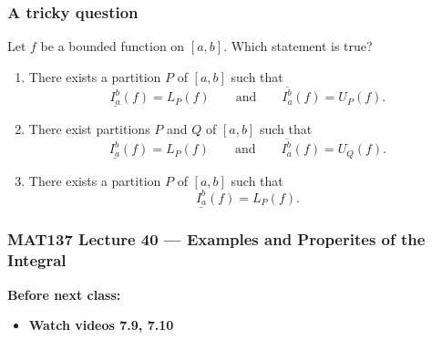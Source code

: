 \documentclass[14pt]{beamer}
\newcommand{\p}{\pause}
\newcommand{\setsize}[1]{\fontsize{#1}{#1}\selectfont} %
\newcommand{\smallerfont}{\setsize{13}} %
\newcommand{\lifab}{\underline{I_a^b}(f)}
\newcommand{\uifab}{\overline{I_a^b}(f)}
\newcommand{\puntos}[2]{ \draw[thick] (-5,0) to (5,0);

\draw[decorate, decoration={brace, amplitude=10pt}, yshift=10pt] (#1-3.5,-0) -- (#1-0,-0)
node [red,midway,yshift=20pt]{lower sums};

\draw[red, fill] (#1-2.5,0) circle [radius=0.1] ; \draw[red, fill] (#1-3.3,0)
circle [radius=0.1] ; \draw[red, fill] (#1-2.0,0) circle [radius=0.1] ; \draw[red,
fill] (#1-1.8,0) circle [radius=0.1] ; \draw[red, fill] (#1-1.3,0) circle [radius=0.1]
; \draw[red, fill] (#1-0.8,0) circle [radius=0.1] ; \draw[red, fill] (#1-0.5,0) circle
[radius=0.1] ; \draw[red, fill] (#1-0.2,0) circle [radius=0.1] ; \draw[red, fill]
(#1-0.05,0) circle [radius=0.1] ;

\draw[decorate, decoration={brace, amplitude=10pt}, yshift=10pt] (#2+0,0) -- (#2+3.5,0)
node [verde,midway,yshift=20pt]{upper sums};

\draw[verde, fill] (#2+2.7,0) circle [radius=0.1] ; \draw[verde, fill] (#2+3.1,0)
circle [radius=0.1] ; \draw[verde, fill] (#2+1.8,0) circle [radius=0.1] ; \draw[verde,
fill] (#2+1.5,0) circle [radius=0.1] ; \draw[verde, fill] (#2+1.2,0) circle [radius=0.1]
; \draw[verde, fill] (#2+0.7,0) circle [radius=0.1] ; \draw[verde, fill] (#2+0.4,0)
circle [radius=0.1] ; \draw[verde, fill] (#2+0.2,0) circle [radius=0.1] ; \draw[verde,
fill] (#2+0.03,0) circle [radius=0.1] ; }
\begin{document}
	\begin{frame}[t]
		\frametitle{A tricky question}

		\smallerfont
		Let $f$ be a bounded function on $[a,b]$. Which statement is true?

		\begin{enumerate}
			\item There exists a partition $P$ of $[a,b]$ such that
				\[
					\lifab=L_{P}(f) \quad \quad \mbox{and}\quad \quad \uifab=U_{P}(f).
				\]

			\item There exist partitions $P$ and $Q$ of $[a,b]$ such that
				\[
					\lifab=L_{P}(f) \quad \quad \mbox{and}\quad \quad \uifab=U_{Q}(f).
				\]
				\p

			\item There exists a partition $P$ of $[a,b]$ such that
				\[
					\lifab=L_{P}(f).
				\]
		\end{enumerate}

		\vspace{-.5cm}
		\begin{center}
		\end{center}
	\end{frame}









\begin{frame}
	\frametitle{MAT137 Lecture 40 --- Examples and Properites of the Integral}

	\vfill
	{\bf Before next class:}
		\begin{itemize} \normalsize
			\item {\bf Watch videos 7.9, 7.10}
		\end{itemize}
\end{frame}
\end{document}
